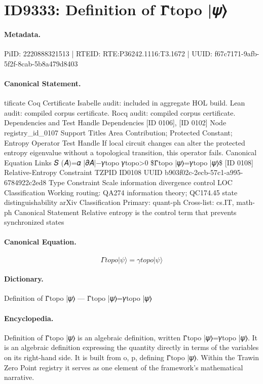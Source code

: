 \section*{ID9333: Definition of Γ̂topo |𝜓⟩}
\paragraph{Metadata.}
PiID: 2220888321513 | RTEID: RTE:P36242.1116:T3.1672 | UUID: f67c7171-9afb-5f2f-8cab-5b8a479d8403

\paragraph{Canonical Statement.}
tificate Coq Certificate Isabelle audit: included in aggregate HOL build. Lean audit: compiled corpus certificate. Rocq audit: compiled corpus certificate. Dependencies and Test Handle Dependencies [ID 0106], [ID 0102] Node registry\_id\_0107 Support Titles Area Contribution; Protected Constant; Entropy Operator Test Handle If local circuit changes can alter the protected entropy eigenvalue without a topological transition, this operator fails. Canonical Equation Links 𝑆 (𝐴)=𝛼 |𝜕𝐴|−𝛾topo 𝛾topo>0 \$Γ̂topo |𝜓⟩=𝛾topo |𝜓⟩\$ [ID 0108] Relative-Entropy Constraint TZPID ID0108 UUID b903f02c-2ecb-57c1-a995-6784922c2ed8 Type Constraint Scale information divergence control LOC Classification Working routing: QA274 information theory; QC174.45 state distinguishability arXiv Classification Primary: quant-ph Cross-list: cs.IT, math-ph Canonical Statement Relative entropy is the control term that prevents synchronized states

\paragraph{Canonical Equation.}
\[
Γ̂topo |𝜓⟩=𝛾topo |𝜓⟩
\]

\paragraph{Dictionary.}
Definition of Γ̂topo |𝜓⟩ — Γ̂topo |𝜓⟩=𝛾topo |𝜓⟩

\paragraph{Encyclopedia.}
Definition of Γ̂topo |𝜓⟩ is an algebraic definition, written Γ̂topo |𝜓⟩=𝛾topo |𝜓⟩. It is an algebraic definition expressing the quantity directly in terms of the variables on its right-hand side. It is built from o, p, defining Γ̂topo |𝜓⟩. Within the Trawin Zero Point registry it serves as one element of the framework's mathematical narrative.
